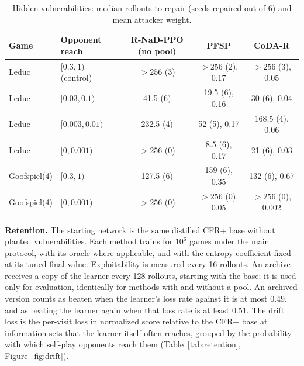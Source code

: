 \documentclass{article} %
\theoremstyle{plain}
\theoremstyle{remark}
\newcommand{\codar}{CoDA-R}
\newcommand{\rnad}{R-NaD-PPO}
\begin{document}
\begin{table}[!htbp]
\caption{Hidden vulnerabilities: median rollouts to repair (seeds repaired out of 6) and mean attacker weight.}
\label{tab:hidden}
\begin{center}
\footnotesize
\begin{tabular}{llccc}
\toprule
Game & Opponent reach & \rnad{} (no pool) & PFSP & \codar{} \\
\midrule
Leduc & $[0.3,1)$ (control) & $>256$ (3) & $>256$ (2), 0.17 & $>256$ (3), 0.05 \\
Leduc & $[0.03,0.1)$ & 41.5 (6) & 19.5 (6), 0.16 & 30 (6), 0.04 \\
Leduc & $[0.003,0.01)$ & 232.5 (4) & 52 (5), 0.17 & 168.5 (4), 0.06 \\
Leduc & $[0,0.001)$ & $>256$ (0) & 8.5 (6), 0.17 & 21 (6), 0.03 \\
Goofspiel(4) & $[0.3,1)$ & 127.5 (6) & 159 (6), 0.35 & 132 (6), 0.67 \\
Goofspiel(4) & $[0,0.001)$ & $>256$ (0) & $>256$ (0), 0.05 & $>256$ (0), 0.002 \\
\bottomrule
\end{tabular}
\end{center}
\end{table}

\textbf{Retention.} The starting network is the same distilled CFR+ base without planted vulnerabilities. Each method trains for $10^6$ games under the main protocol, with its oracle where applicable, and with the entropy coefficient fixed at its tuned final value. Exploitability is measured every 16 rollouts. An archive receives a copy of the learner every 128 rollouts, starting with the base; it is used only for evaluation, identically for methods with and without a pool. An archived version counts as beaten when the learner's loss rate against it is at most 0.49, and as beating the learner again when that loss rate is at least 0.51. The drift loss is the per-visit loss in normalized score relative to the CFR+ base at information sets that the learner itself often reaches, grouped by the probability with which self-play opponents reach them (Table~\ref{tab:retention}, Figure~\ref{fig:drift}).
\end{document}

